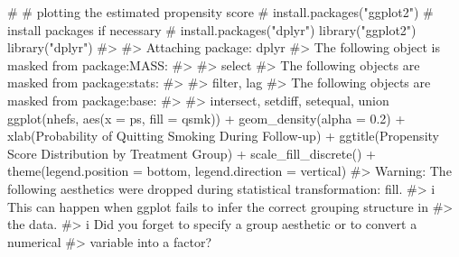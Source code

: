 \documentclass[
  10pt,
  a4paper,
]{book}
\newenvironment{Shaded}{\begin{snugshade}}{\end{snugshade}}
\newcommand{\AttributeTok}[1]{\textcolor[rgb]{0.40,0.45,0.13}{#1}}
\newcommand{\CommentTok}[1]{\textcolor[rgb]{0.37,0.37,0.37}{#1}}
\newcommand{\FloatTok}[1]{\textcolor[rgb]{0.68,0.00,0.00}{#1}}
\newcommand{\FunctionTok}[1]{\textcolor[rgb]{0.28,0.35,0.67}{#1}}
\newcommand{\NormalTok}[1]{\textcolor[rgb]{0.00,0.46,0.62}{#1}}
\newcommand{\SpecialCharTok}[1]{\textcolor[rgb]{0.37,0.37,0.37}{#1}}
\newcommand{\StringTok}[1]{\textcolor[rgb]{0.13,0.47,0.30}{#1}}
\begin{document}
\begin{Shaded}
\begin{Highlighting}[]
\CommentTok{\# \# plotting the estimated propensity score}
\CommentTok{\# install.packages("ggplot2") \# install packages if necessary}
\CommentTok{\# install.packages("dplyr")}
\FunctionTok{library}\NormalTok{(}\StringTok{"ggplot2"}\NormalTok{)}
\FunctionTok{library}\NormalTok{(}\StringTok{"dplyr"}\NormalTok{)}
\CommentTok{\#\textgreater{} }
\CommentTok{\#\textgreater{} Attaching package: \textquotesingle{}dplyr\textquotesingle{}}
\CommentTok{\#\textgreater{} The following object is masked from \textquotesingle{}package:MASS\textquotesingle{}:}
\CommentTok{\#\textgreater{} }
\CommentTok{\#\textgreater{}     select}
\CommentTok{\#\textgreater{} The following objects are masked from \textquotesingle{}package:stats\textquotesingle{}:}
\CommentTok{\#\textgreater{} }
\CommentTok{\#\textgreater{}     filter, lag}
\CommentTok{\#\textgreater{} The following objects are masked from \textquotesingle{}package:base\textquotesingle{}:}
\CommentTok{\#\textgreater{} }
\CommentTok{\#\textgreater{}     intersect, setdiff, setequal, union}
\FunctionTok{ggplot}\NormalTok{(nhefs, }\FunctionTok{aes}\NormalTok{(}\AttributeTok{x =}\NormalTok{ ps, }\AttributeTok{fill =}\NormalTok{ qsmk)) }\SpecialCharTok{+} \FunctionTok{geom\_density}\NormalTok{(}\AttributeTok{alpha =} \FloatTok{0.2}\NormalTok{) }\SpecialCharTok{+}
  \FunctionTok{xlab}\NormalTok{(}\StringTok{\textquotesingle{}Probability of Quitting Smoking During Follow{-}up\textquotesingle{}}\NormalTok{) }\SpecialCharTok{+}
  \FunctionTok{ggtitle}\NormalTok{(}\StringTok{\textquotesingle{}Propensity Score Distribution by Treatment Group\textquotesingle{}}\NormalTok{) }\SpecialCharTok{+}
  \FunctionTok{scale\_fill\_discrete}\NormalTok{(}\StringTok{\textquotesingle{}\textquotesingle{}}\NormalTok{) }\SpecialCharTok{+}
  \FunctionTok{theme}\NormalTok{(}\AttributeTok{legend.position =} \StringTok{\textquotesingle{}bottom\textquotesingle{}}\NormalTok{, }\AttributeTok{legend.direction =} \StringTok{\textquotesingle{}vertical\textquotesingle{}}\NormalTok{)}
\CommentTok{\#\textgreater{} Warning: The following aesthetics were dropped during statistical transformation: fill.}
\CommentTok{\#\textgreater{} i This can happen when ggplot fails to infer the correct grouping structure in}
\CommentTok{\#\textgreater{}   the data.}
\CommentTok{\#\textgreater{} i Did you forget to specify a \textasciigrave{}group\textasciigrave{} aesthetic or to convert a numerical}
\CommentTok{\#\textgreater{}   variable into a factor?}
\end{Highlighting}
\end{Shaded}
\end{document}
